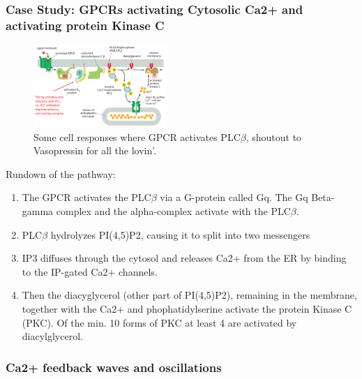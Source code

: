 \documentclass[../main.tex]{subfiles}
\begin{document}
\subsubsection{Case Study: GPCRs activating Cytosolic Ca2+ and activating protein Kinase C}
\begin{figure}[H]
	\centering
	\includegraphics[width=0.45\textwidth]{PLC_Ca}
	\caption{Some cell responses where GPCR activates PLC$\beta$, shoutout to Vasopressin for all the lovin'.}
\end{figure}
Rundown of the pathway:
\begin{enumerate}
	\item The GPCR activates the PLC$\beta$ via a G-protein called Gq. The Gq Beta-gamma complex and the alpha-complex activate with the PLC$\beta$. 
	\item PLC$\beta$ hydrolyzes PI(4,5)P2, causing it to split into two messengers
	\item IP3 diffuses through the cytosol and releases Ca2+ from the ER by binding to the IP-gated Ca2+ channels.
	\item Then the diacyglycerol (other part of PI(4,5)P2), remaining in the membrane, together with the Ca2+ and phophatidylserine activate the protein Kinase C (PKC). Of the min. 10 forms of PKC at least 4 are activated by diacylglycerol.
\end{enumerate}

\subsubsection{Ca2+ feedback waves and oscillations}
\end{document}
